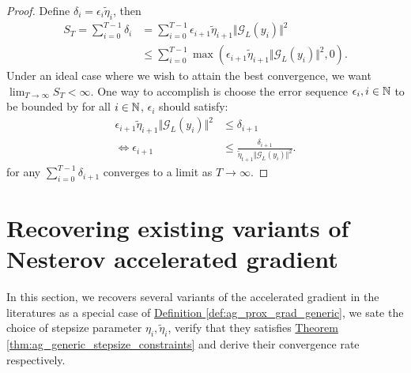 \documentclass[12pt]{article}
\begin{document}
\begin{proof}
        Define $\delta_i = \epsilon_{i} \tilde \eta_i$, then 
        \begin{align*}
            S_{T} = 
            \sum_{i = 0}^{T- 1} \delta_i 
            &= 
            \sum_{i = 0}^{T - 1} \epsilon_{i + 1}\tilde\eta_{i + 1}\Vert \mathcal G_L(y_i)\Vert^2
            \\
            &\le \sum_{i = 0}^{T - 1}\max(\epsilon_{i + 1} \tilde\eta_{i + 1}\Vert \mathcal G_L(y_i)\Vert^2, 0). 
        \end{align*}
        Under an ideal case where we wish to attain the best convergence, we want $\lim_{T \rightarrow \infty} S_T < \infty$. 
        One way to accomplish is choose the error sequence $\epsilon_i, i \in \mathbb N$ to be bounded by for all $i \in \mathbb N$, $\epsilon_i$ should satisfy: 
        \begin{align*}
            \epsilon_{i + 1}\tilde \eta_{i + 1}
            \Vert \mathcal G_L(y_i)\Vert^2 
            &\le \delta_{i + 1}
            \\
            \iff 
            \epsilon_{i + 1}
            &\le 
            \frac{\delta_{i + 1} }{\tilde\eta_{t + 1}\Vert \mathcal G_L(y_i)\Vert^2}. 
        \end{align*}
        for any $\sum_{i = 0}^{T - 1}\delta_{i + 1}$ converges to a limit as $T \rightarrow \infty$. 

    \end{proof}

\section{Recovering existing variants of Nesterov accelerated gradient}\label{sec:recovery}
    In this section, we recovers several variants of the accelerated gradient in the literatures as a special case of 
    \hyperref[def:ag_prox_grad_generic]{Definition \ref*{def:ag_prox_grad_generic}}, 
    we sate the choice of stepsize parameter $\eta_i, \tilde \eta_i$, verify that they satisfies 
    \hyperref[thm:ag_generic_stepsize_constraints]
    {Theorem \ref*{thm:ag_generic_stepsize_constraints}}
    and derive their convergence rate respectively. 
    
\end{document}
